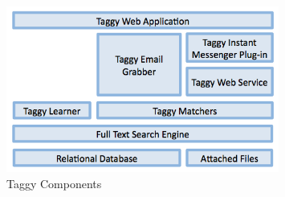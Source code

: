 \begin{figure}[bt]
	\centering
	\includegraphics[width=0.8\textwidth]{architecture.png}
    \caption{Taggy Components}
	\label{fig:architecture}
\end{figure}

